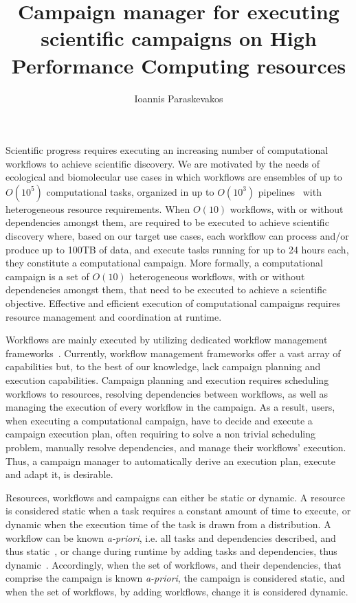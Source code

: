 
\title{Campaign manager for executing scientific campaigns on High Performance Computing resources}\author{Ioannis Paraskevakos}


\maketitle

Scientific progress requires executing an increasing number of computational workflows to achieve scientific discovery. We are motivated by the needs of ecological and biomolecular use cases in which workflows are ensembles of up to $O(10^5)$ computational tasks, organized in up to $O(10^3)$ pipelines~\cite{rietmann2012forward, dakka2018high, paraskevakos2019workflow} with heterogeneous resource requirements. When $O(10)$ workflows, with or without dependencies amongst them, are required to be executed to achieve scientific discovery where, based on our target use cases, each workflow can process and/or produce up to 100TB of data, and execute tasks running for up to 24 hours each, they constitute a computational campaign. More formally, a computational campaign is a set of $O(10)$ heterogeneous workflows, with or without dependencies amongst them, that need to be executed to achieve a scientific objective. Effective and efficient execution of computational campaigns requires resource management and coordination at runtime.


Workflows are mainly executed by utilizing dedicated workflow management frameworks~\cite{balasubramanian2018harnessing,deelman2015pegasus,ludascher2006scientific,rocklin2015dask,airflow}. Currently, workflow management frameworks offer a vast array of capabilities but, to the best of our knowledge, lack campaign planning and execution capabilities. Campaign planning and execution requires scheduling workflows to resources, resolving dependencies between workflows, as well as managing the execution of every workflow in the campaign. As a result, users, when executing a computational campaign, have to decide and execute a campaign execution plan, often requiring to solve a non trivial scheduling problem, manually resolve dependencies, and manage their workflows’ execution. Thus, a campaign manager to automatically derive an execution plan, execute and adapt it, is desirable.


Resources, workflows and campaigns can either be static or dynamic. A resource is considered static when a task requires a constant amount of time to execute, or dynamic when the execution time of the task is drawn from a distribution.  A workflow can be known \textit{a-priori}, i.e. all tasks and dependencies described, and thus static~\cite{paraskevakos2019workflow}, or change during runtime by adding tasks and dependencies, thus dynamic~\cite{dakka2018high}. Accordingly, when the set of workflows, and their dependencies, that comprise the campaign is known \textit{a-priori}, the campaign is considered static, and when the set of workflows, by adding workflows, change it is considered dynamic.


